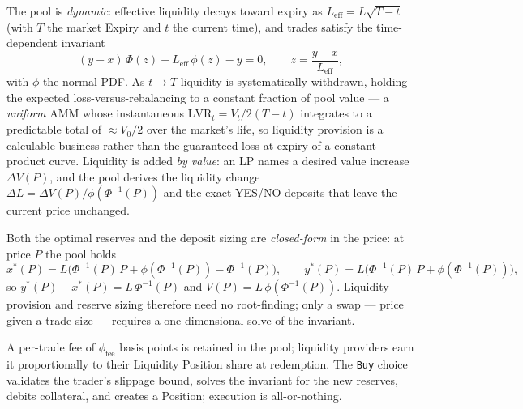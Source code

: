 \documentclass[11pt,a4paper]{article}
\begin{document}
The pool is \emph{dynamic}: effective liquidity decays toward expiry as $L_{\mathrm{eff}} = L\sqrt{T - t}$ (with $T$ the market Expiry and $t$ the current time), and trades satisfy the time-dependent invariant
\[
(y - x)\,\Phi(z) + L_{\mathrm{eff}}\,\phi(z) - y = 0, \qquad z = \frac{y - x}{L_{\mathrm{eff}}},
\]
with $\phi$ the normal PDF. As $t \to T$ liquidity is systematically withdrawn, holding the expected loss-versus-rebalancing to a constant fraction of pool value --- a \emph{uniform} AMM whose instantaneous $\mathrm{LVR}_t = V_t / 2(T - t)$ integrates to a predictable total of $\approx V_0/2$ over the market's life, so liquidity provision is a calculable business rather than the guaranteed loss-at-expiry of a constant-product curve. Liquidity is added \emph{by value}: an LP names a desired value increase $\Delta V(P)$, and the pool derives the liquidity change $\Delta L = \Delta V(P) / \phi(\Phi^{-1}(P))$ and the exact YES/NO deposits that leave the current price unchanged.

Both the optimal reserves and the deposit sizing are \emph{closed-form} in the price: at price $P$ the pool holds
\[
x^*(P) = L\bigl(\Phi^{-1}(P)\,P + \phi(\Phi^{-1}(P)) - \Phi^{-1}(P)\bigr), \qquad
y^*(P) = L\bigl(\Phi^{-1}(P)\,P + \phi(\Phi^{-1}(P))\bigr),
\]
so $y^*(P) - x^*(P) = L\,\Phi^{-1}(P)$ and $V(P) = L\,\phi(\Phi^{-1}(P))$. Liquidity provision and reserve sizing therefore need no root-finding; only a swap --- price given a trade size --- requires a one-dimensional solve of the invariant.

A per-trade fee of $\phi_{\mathrm{fee}}$ basis points is retained in the pool; liquidity providers earn it proportionally to their Liquidity Position share at redemption. The \texttt{Buy} choice validates the trader's slippage bound, solves the invariant for the new reserves, debits collateral, and creates a Position; execution is all-or-nothing.
\end{document}
